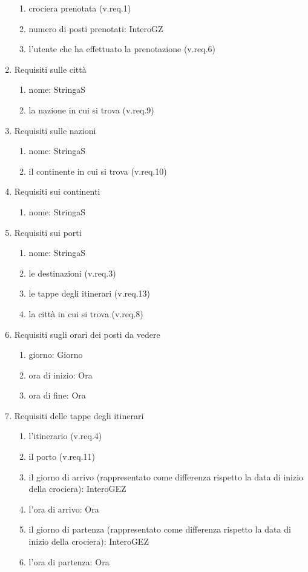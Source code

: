 \documentclass{article}
\begin{document}
\begin{enumerate}
\begin{enumerate}
        \item crociera prenotata (v.req.1)
        \item numero di posti prenotati: InteroGZ
        \item l'utente che ha effettuato la prenotazione (v.req.6)
    \end{enumerate}
    \item Requisiti sulle città
    \begin{enumerate}
        \item nome: StringaS
        \item la nazione in cui si trova (v.req.9)
    \end{enumerate}
    \item Requisiti sulle nazioni
    \begin{enumerate}
        \item nome: StringaS
        \item il continente in cui si trova (v.req.10)
    \end{enumerate}
    \item Requisiti sui continenti
    \begin{enumerate}
        \item nome: StringaS
    \end{enumerate}
    \item Requisiti sui porti
    \begin{enumerate}
        \item nome: StringaS
        \item le destinazioni (v.req.3)
        \item le tappe degli itinerari (v.req.13)
        \item la città in cui si trova (v.req.8)
    \end{enumerate}
    \item Requisiti sugli orari dei posti da vedere
    \begin{enumerate}
        \item giorno: Giorno
        \item ora di inizio: Ora
        \item ora di fine: Ora
    \end{enumerate}
    \item Requisiti delle tappe degli itinerari
    \begin{enumerate}
        \item l'itinerario (v.req.4)
        \item il porto (v.req.11)
        \item il giorno di arrivo (rappresentato come differenza rispetto la data di inizio della crociera): InteroGEZ
        \item l'ora di arrivo: Ora
        \item il giorno di partenza (rappresentato come differenza rispetto la data di inizio della crociera): InteroGEZ
        \item l'ora di partenza: Ora
    \end{enumerate}
\end{enumerate}
\end{document}
